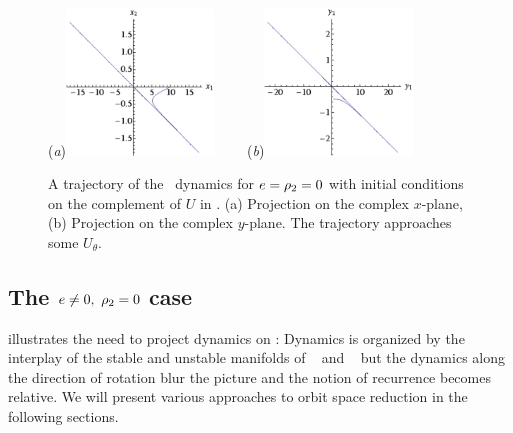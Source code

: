 \begin{figure}[t]
\begin{center}
  (\textit{a})\includegraphics[width=0.35\textwidth]{../figs/CLe0transA}
~~~~(\textit{b})\includegraphics[width=0.35\textwidth]{../figs/CLe0transB}
\end{center}
\caption[Transient trajectory in degenerate Complex Lorenz flow]{ A trajectory
of the \CLe\ dynamics for $e=\rho_2=0$ with
initial conditions on the complement of $U$ in . (a) Projection on the
complex $x$-plane, (b) Projection on the complex $y$-plane. The trajectory
approaches some $U_\theta$.
    }
\label{fig:CLe0trans}
\end{figure}

\subsection{The $e\neq0,\ \ImrCLor=0$ case}

 illustrates the need
to project dynamics on \reducedsp: Dynamics is organized by
the interplay of the stable and unstable manifolds of \eqv\
 and \reqv\  but the dynamics along the
direction of rotation blur the picture and the notion of
recurrence becomes relative. We will present various
approaches to orbit space reduction in the following
sections.


